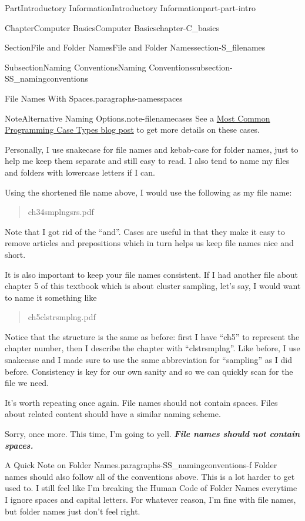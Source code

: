 \documentclass[oneside,10pt,]{book}
\newcommand{\alert}[1]{\textbf{\textit{#1}}}
\begin{document}
\begin{partptx}{Part}{Introductory Information}{}{Introductory Information}{}{}{part-part-intro}
\begin{chapterptx}{Chapter}{Computer Basics}{}{Computer Basics}{}{}{chapter-C_basics}
\begin{sectionptx}{Section}{File and Folder Names}{}{File and Folder Names}{}{}{section-S_filenames}
\begin{subsectionptx}{Subsection}{Naming Conventions}{}{Naming Conventions}{}{}{subsection-SS_namingconventions}
\begin{paragraphs}{File Names With Spaces.}{paragraphs-namesspaces}
\begin{note}{Note}{Alternative Naming Options.}{note-filenamecases}
See a \href{https://chaseadams.io/posts/most-common-programming-case-types/}{Most Common Programming Case Types blog post}\footnotemark{} to get more details on these cases.%
\end{note}
%
Personally, I use snake\textunderscore{}case for file names and kebab-case for folder names, just to help me keep them separate and still easy to read. I also tend to name my files and folders with lowercase letters if I can.%
\par
Using the shortened file name above, I would use the following as my file name:%
\begin{quote}%
ch3\textunderscore{}4\textunderscore{}smplng\textunderscore{}srs.pdf%
\end{quote}
Note that I got rid of the ``and''. Cases are useful in that they make it easy to remove articles and prepositions which in turn helps us keep file names nice and short.%
\par
It is also important to keep your file names consistent. If I had another file about chapter 5 of this textbook which is about cluster sampling, let's say, I would want to name it something like%
\begin{quote}%
ch5\textunderscore{}clstr\textunderscore{}smplng.pdf%
\end{quote}
Notice that the structure is the same as before: first I have ``ch5'' to represent the chapter number, then I describe the chapter with ``clstr\textunderscore{}smplng''. Like before, I use snake\textunderscore{}case and I made sure to use the same abbreviation for ``sampling'' as I did before. Consistency is key for our own sanity and so we can quickly scan for the file we need.%
\par
It's worth repeating once again. File names should not contain spaces. Files about related content should have a similar naming scheme.%
\par
Sorry, once more. This time, I'm going to yell. \alert{File names should not contain spaces.}%
\end{paragraphs}%
\begin{paragraphs}{A Quick Note on Folder Names.}{paragraphs-SS_namingconventions-f}%
%
%
Folder names should also follow all of the conventions above. This is a lot harder to get used to. I still feel like I'm breaking the Human Code of Folder Names everytime I ignore spaces and capital letters. For whatever reason, I'm fine with file names, but folder names just don't feel right.%

\end{paragraphs}
\end{subsectionptx}
\end{sectionptx}
\end{chapterptx}
\end{partptx}
\end{document}
